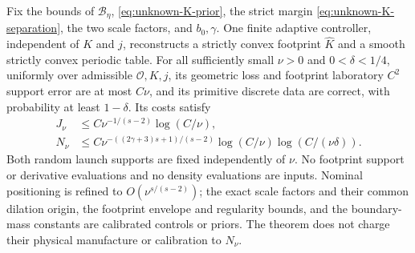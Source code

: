 \begin{theorem}
\label{thm:self-finite}
Fix the bounds of $\mathcal B_\eta$, \eqref{eq:unknown-K-prior},
the strict margin \eqref{eq:unknown-K-separation}, the two scale factors,
and $b_0,\gamma$. One finite adaptive controller, independent of $K$
and $j$, reconstructs a strictly convex footprint $\widehat K$ and a
smooth strictly convex periodic table. For all sufficiently small
$\nu>0$ and $0<\delta<1/4$, uniformly over admissible $\mathcal O,K,j$,
its geometric loss and footprint laboratory $C^2$ support error are at
most $C\nu$, and its primitive discrete data are correct, with
probability at least $1-\delta$. Its costs satisfy
\begin{align}
 J_\nu&\le C\nu^{-1/(s-2)}\log(C/\nu),\label{eq:self-centers}\\
 N_\nu&\le C\nu^{-((2\gamma+3)s+1)/(s-2)}
                \log(C/\nu)\log(C/(\nu\delta)).\label{eq:self-attempts}
\end{align}
Both random launch supports are fixed independently of $\nu$.
No footprint support or derivative evaluations and no density evaluations
are inputs. Nominal positioning is refined to
$O(\nu^{s/(s-2)})$; the exact scale factors and their common dilation
origin, the footprint envelope and regularity bounds, and the boundary-mass
constants are calibrated controls or priors. The theorem does not charge
their physical manufacture or calibration to $N_\nu$.
\end{theorem}
